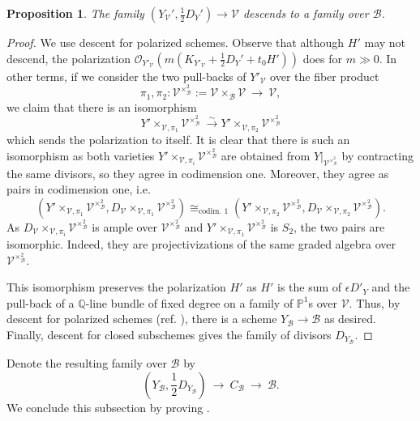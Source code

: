 \documentclass[a4paper,12pt]{amsart}
\newcommand{\bQ}{{\mathbb Q}}
\newcommand{\bP}{{\mathbb P}}
\newcommand{\sB}{{\mathscr{B}}}
\newcommand{\cO}{{\mathcal{O}}}
\newcommand{\cV}{{\mathcal{V}}}
\newtheorem{prop}[theorem]{Proposition}
\theoremstyle{definition}
\theoremstyle{remark}
\begin{document}
\begin{prop}
    The family $(Y_\cV',\frac{1}{2}D_Y')\to \cV$ descends to a family over $\sB$. 
\end{prop}

\begin{proof}
We use descent for polarized schemes. Observe that although $H'$ may not descend, the polarization $\cO_{Y'_\cV}(m(K_{Y'_\cV}+\frac{1}{2}D_Y'+t_0H'))$ does for $m\gg0$. In other terms, if we consider the two pull-backs of $Y'_\cV$ over the fiber product 
\[
\pi_1,\pi_2\colon \cV^{\times_\sB ^2}:=\cV\times_\sB\cV \ \longrightarrow \  \cV,
\]
we claim that there is an isomorphism \[Y'\times_{\cV,\pi_1} \cV^{\times_\sB ^2} \ \stackrel{\sim}{\longrightarrow} Y'\times_{\cV,\pi_2} \cV^{\times_\sB ^2}\]
which sends the polarization to itself. It is clear that there is such an isomorphism as both varieties $Y'\times_{\cV,\pi_i} \cV^{\times_\sB ^2}$ are obtained from $Y|_{ \cV^{\times_\sB ^2}}$ by contracting the same divisors, so they agree in codimension one. Moreover, they agree as pairs in codimension one, i.e. 
\[(Y'\times_{\cV,\pi_1} \cV^{\times_\sB ^2},D_\cV\times_{\cV,\pi_1} \cV^{\times_\sB ^2})\cong_{\text{codim. 1}}  (Y'\times_{\cV,\pi_2} \cV^{\times_\sB ^2},D_\cV\times_{\cV,\pi_2} \cV^{\times_\sB ^2}).\]
As $D_\cV\times_{\cV,\pi_i} \cV^{\times_\sB ^2}$ is ample over $\cV^{\times_\sB ^2}$ and $Y'\times_{\cV,\pi_1} \cV^{\times_\sB ^2}$ is $S_2$, the two pairs are isomorphic. Indeed, they are projectivizations of the same graded algebra over $\cV^{\times_\sB ^2}$.

This isomorphism preserves the polarization $H'$ as $H'$ is the sum of $\epsilon D'_Y$ and the pull-back of a $\bQ$-line bundle of fixed degree on a family of $\bP^1$s over $\cV$. Thus, by descent for polarized schemes
(ref. \cite[\href{https://stacks.math.columbia.edu/tag/0D1L}{Tag 0D1L}]{stacks-project}), there is a scheme $Y_{\sB}\to \sB$ as desired. Finally, descent for closed subschemes gives the family of divisors $D_{Y_{\sB}}$.
\end{proof}

Denote the resulting family over $\sB$ by $$\textstyle (Y_{\sB},\frac{1}{2}D_{Y_{\sB}}) \ \longrightarrow \ C_{\sB}  \ \longrightarrow \  \sB.$$ We conclude this subsection by proving .
\end{document}
